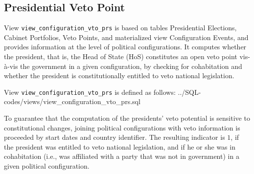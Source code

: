 \subsection{Presidential Veto Point}\label{view_configuration_vto_prs}
View \texttt{view\_configuration\_vto\_prs} is based on tables Presidential Elections, Cabinet Portfolios, Veto Points, and materialized view Configuration Events, and provides information at the level of political configurations.
It computes whether the president, that is, the Head of State (HoS) constitutes an open veto point vis-\`{a}-vis the government in a given configuration, by checking for cohabitation and whether the president is constitutionally entitled to veto national legislation. 

View \texttt{view\_configuration\_vto\_prs} is defined as follows:
%
{../SQL-codes/views/view_configuration_vto_prs.sql}

To guarantee that the computation of the presidents' veto potential is sensitive to constitutional changes, joining political configurations with veto information is proceeded by start dates and country identifier.
The resulting indicator is $1$, if the president was entitled to veto national legislation, and if he or she was in cohabitation (i.e., was affiliated with a party that was not in government) in a given political configuration.
